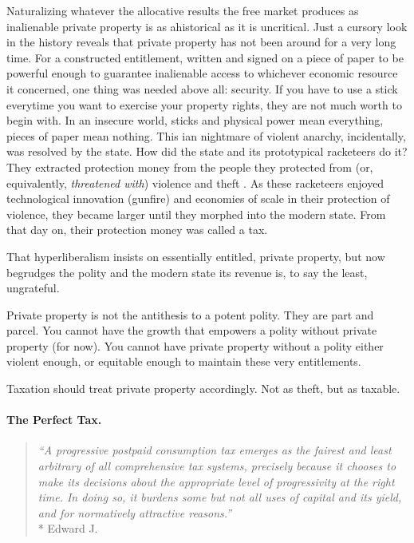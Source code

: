 Naturalizing whatever the allocative results the free market produces as inalienable private property is as ahistorical as it is uncritical.
Just a cursory look in the history reveals that  private property has not been around for a very long time.
For a constructed entitlement, written and signed on a piece of paper to be powerful enough to guarantee inalienable access to whichever economic resource it concerned, one thing was needed above all:
security.
If you have to use a stick everytime you want to exercise your property rights, they are not much worth to begin with.
In an insecure world, sticks and physical power mean everything, pieces of paper mean nothing.
This \citeauthor{Hobbes-1651-aa}ian nightmare of violent anarchy, incidentally, was resolved by the state.
How did the state and its prototypical racketeers do it?
They extracted protection money from the people they protected from (or, equivalently, \emph{threatened with}) violence and theft \citep{Tilly-1985-aa}.
As these racketeers enjoyed technological innovation (gunfire) and economies of scale in their protection of violence, they became larger until they morphed into the modern state.
From that day on, their protection money was called a tax.

That hyperliberalism insists on essentially entitled, private property, but now begrudges the polity and the modern state its revenue is, to say the least, ungrateful.

Private property is not the antithesis to a potent polity.
They are part and parcel.
You cannot have the growth that empowers a polity without private property (for now).
You cannot have private property without a polity either violent enough, or equitable enough to maintain these very entitlements.

Taxation should treat private property accordingly.
Not as theft, but as taxable.

\paragraph{The Perfect Tax.}

\begin{quote}
	\emph{``A progressive postpaid consumption tax emerges as the fairest and least arbitrary of all comprehensive tax systems, precisely because it chooses to make its decisions about the appropriate level of progressivity at the right time.
	In doing so, it burdens some but not all uses of capital and its yield, and for normatively attractive reasons.''}
	\\*
	Edward J.\ \citet[812]{McCaffery2005}
\end{quote}

